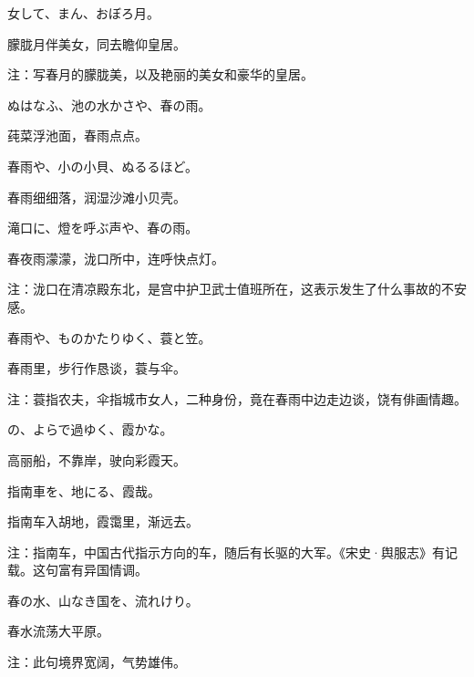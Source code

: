\begin{haiku}
    {\FH 女して、まん、おぼろ月。}

    {\FK 朦胧月伴美女，同去瞻仰皇居。}

    {\FT 注：写春月的朦胧美，以及艳丽的美女和豪华的皇居。}
\end{haiku}

\begin{haiku}
    {\FH ぬはなふ、池の水かさや、春の雨。}

    {\FK 莼菜浮池面，春雨点点。}
\end{haiku}

\begin{haiku}
    {\FH 春雨や、小の小貝、ぬるるほど。}

    {\FK 春雨细细落，润湿沙滩小贝壳。}
\end{haiku}

\begin{haiku}
    {\FH 滝口に、燈を呼ぶ声や、春の雨。}

    {\FK 春夜雨濛濛，泷口所中，连呼快点灯。}

    {\FT 注：泷口在清凉殿东北，是宫中护卫武士值班所在，这表示发生了什么事故的不安感。}
\end{haiku}

\begin{haiku}
    {\FH 春雨や、ものかたりゆく、蓑と笠。}

    {\FK 春雨里，步行作恳谈，蓑与伞。}

    {\FT 注：蓑指农夫，伞指城市女人，二种身份，竟在春雨中边走边谈，饶有俳画情趣。}
\end{haiku}

\begin{haiku}
    {\FH {}の、よらで過ゆく、霞かな。}

    {\FK 高丽船，不靠岸，驶向彩霞天。}
\end{haiku}

\begin{haiku}
    {\FH 指南車を、地にる、霞哉。}

    {\FK 指南车入胡地，霞霭里，渐远去。}

    {\FT 注：指南车，中国古代指示方向的车，随后有长驱的大军。《宋史·舆服志》有记载。这句富有异国情调。}
\end{haiku}

\begin{haiku}
    {\FH 春の水、山なき国を、流れけり。}

    {\FK 春水流荡大平原。}

    {\FT 注：此句境界宽阔，气势雄伟。}
\end{haiku}

